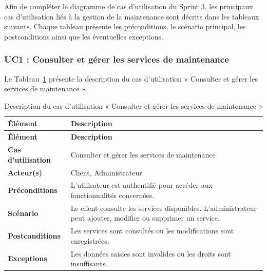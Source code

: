 Afin de compléter le diagramme de cas d'utilisation du Sprint 3, les principaux cas d'utilisation liés à la gestion de la maintenance sont décrits dans les tableaux suivants. Chaque tableau présente les préconditions, le scénario principal, les postconditions ainsi que les éventuelles exceptions.

\subsubsection{UC1 : Consulter et gérer les services de maintenance}

Le Tableau~\ref{tab:uc1-maintenance} présente la description du cas d'utilisation « Consulter et gérer les services de maintenance ».

\begin{longtable}{|>{\RaggedRight\arraybackslash}p{4cm}|>{\RaggedRight\arraybackslash}p{10.5cm}|}

\caption{Description du cas d'utilisation « Consulter et gérer les services de maintenance »}
\label{tab:uc1-maintenance}\\

\hline
\textbf{Élément} & \textbf{Description} \\
\hline
\endfirsthead

\hline
\textbf{Élément} & \textbf{Description} \\
\hline
\endhead

\textbf{Cas d'utilisation} &
Consulter et gérer les services de maintenance \\
\hline

\textbf{Acteur(s)} &
Client, Administrateur \\
\hline

\textbf{Préconditions} &
L'utilisateur est authentifié pour accéder aux fonctionnalités concernées. \\
\hline

\textbf{Scénario} &
Le client consulte les services disponibles. L'administrateur peut ajouter, modifier ou supprimer un service. \\
\hline

\textbf{Postconditions} &
Les services sont consultés ou les modifications sont enregistrées. \\
\hline

\textbf{Exceptions} &
Les données saisies sont invalides ou les droits sont insuffisants. \\
\hline

\end{longtable}



